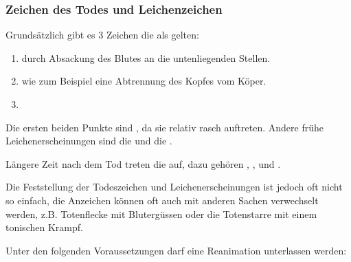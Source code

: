 





\subsubsection{Zeichen des Todes und Leichenzeichen}


Grundsätzlich gibt es 3 Zeichen die als  gelten:

\begin{enumerate}
    \item {} durch
    Absackung des Blutes an die untenliegenden Stellen.
    \item {}
    wie zum Beispiel eine Abtrennung des Kopfes vom Köper.
    \item {}
\end{enumerate}

Die ersten beiden Punkte sind , da sie relativ rasch auftreten.
Andere frühe Leichenerscheinungen sind die  und die . 

Längere Zeit nach dem Tod treten die  auf, dazu gehören , ,  und
. 

Die Feststellung der Todeszeichen und Leichenerscheinungen
ist jedoch oft nicht so einfach, die Anzeichen können oft
auch mit anderen Sachen verwechselt werden, z.B.
Totenflecke mit Blutergüssen oder die Totenstarre mit einem
tonischen Krampf.



Unter den folgenden Voraussetzungen darf eine
Reanimation unterlassen werden:

